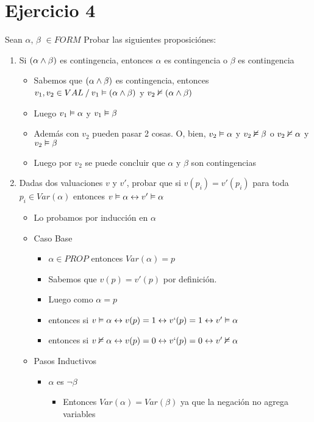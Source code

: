 \documentclass[14pt,a4paper,fleqn]{article}
\begin{document}
\section*{Ejercicio 4}
Sean $\alpha$, $\beta$ $\in FORM$ Probar las siguientes proposiciónes:
\begin{enumerate}
	\item Si $(\alpha \wedge \beta)$ es contingencia, entonces $\alpha$ es contingencia o $\beta$ es contingencia
	\begin{itemize}
		\item Sabemos que $(\alpha \wedge \beta)$ es contingencia, entonces $v_1, v_2 \in VAL \: / \: v_1 \vDash (\alpha \wedge \beta) $ y $v_2 \nvDash (\alpha \wedge \beta)$
		\item Luego $v_1 \vDash \alpha$ y $v_1 \vDash \beta$
		\item Además con $v_2$ pueden pasar 2 cosas. O, bien, $v_2 \vDash \alpha$ y $v_2 \nvDash \beta$ o $v_2 \nvDash \alpha$ y $v_2 \vDash \beta$
		\item Luego por $v_2$ se puede concluir que $\alpha$ y $\beta$ son contingencias
	\end{itemize}
	\item Dadas dos valuaciones $v$ y $v'$, probar que si $v(p_i) = v'(p_i) $ para toda $p_i \in Var(\alpha)$ entonces $v \vDash \alpha \leftrightarrow v' \vDash \alpha$
	\begin{itemize}
		\item Lo probamos por inducción en $\alpha$
		\item Caso Base
		\begin{itemize}
			\item $\alpha \in PROP$ entonces $Var(\alpha) = {p}$
			\item Sabemos que $v(p)=v'(p)$ por definición. 
			\item Luego como $\alpha = p$ 
			\item entonces si $v \vDash \alpha \leftrightarrow v(p) = 1 \leftrightarrow v`(p) =1 \leftrightarrow v' \vDash \alpha$
			\item entonces si $v \nvDash \alpha \leftrightarrow v(p) = 0 \leftrightarrow v`(p) = 0 \leftrightarrow v' \nvDash \alpha$
		\end{itemize}
		\item Pasos Inductivos
		\begin{itemize}
			\item $\alpha$ es $\neg \beta$
			\begin{itemize}
				\item Entonces $Var(\alpha) = Var(\beta)$ ya que la negación no agrega variables				

\end{itemize}
\end{itemize}
\end{itemize}
\end{enumerate}
\end{document}
